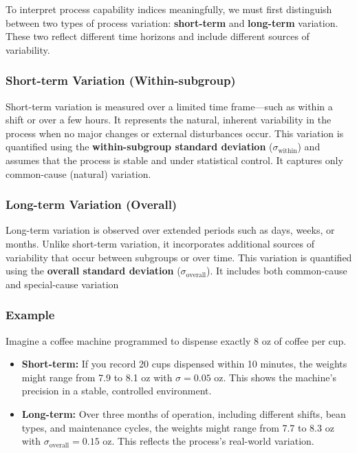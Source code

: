 \documentclass[twoside]{book}
\begin{document}
To interpret process capability indices meaningfully, we must first distinguish between two types of process variation: \textbf{short-term} and \textbf{long-term} variation. These two reflect different time horizons and include different sources of variability.

\subsubsection*{Short-term Variation (Within-subgroup)}

Short-term variation is measured over a limited time frame—such as within a shift or over a few hours. It represents the natural, inherent variability in the process when no major changes or external disturbances occur. This variation is quantified using the \textbf{within-subgroup standard deviation} (\(\sigma_{\text{within}}\)) and assumes that the process is stable and under statistical control. It captures only common-cause (natural) variation.

\subsubsection*{Long-term Variation (Overall)}

Long-term variation is observed over extended periods such as days, weeks, or months. Unlike short-term variation, it incorporates additional sources of variability that occur between subgroups or over time. This variation is quantified using the \textbf{overall standard deviation} (\(\sigma_{\text{overall}}\)). It includes both common-cause and special-cause variation

\subsubsection*{Example}

Imagine a coffee machine programmed to dispense exactly 8 oz of coffee per cup.

\begin{itemize}
    \item \textbf{Short-term:} If you record 20 cups dispensed within 10 minutes, the weights might range from 7.9 to 8.1 oz with \(\sigma = 0.05\) oz. This shows the machine's precision in a stable, controlled environment.
    \item \textbf{Long-term:} Over three months of operation, including different shifts, bean types, and maintenance cycles, the weights might range from 7.7 to 8.3 oz with \(\sigma_{\text{overall}} = 0.15\) oz. This reflects the process’s real-world variation.
\end{itemize}
\end{document}
